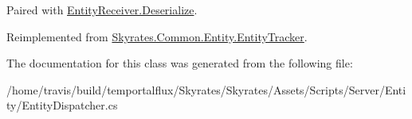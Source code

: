Paired with \hyperlink{class_skyrates_1_1_common_1_1_entity_1_1_entity_receiver_a9da0b7c3a8b9e1ed7d10be74ce80482b}{Entity\-Receiver.\-Deserialize}. 



Reimplemented from \hyperlink{class_skyrates_1_1_common_1_1_entity_1_1_entity_tracker_a4ede7aaa958e764abcf7404c780457f4}{Skyrates.\-Common.\-Entity.\-Entity\-Tracker}.



The documentation for this class was generated from the following file\-:\begin{DoxyCompactItemize}
\item 
/home/travis/build/temportalflux/\-Skyrates/\-Skyrates/\-Assets/\-Scripts/\-Server/\-Entity/Entity\-Dispatcher.\-cs\end{DoxyCompactItemize}
